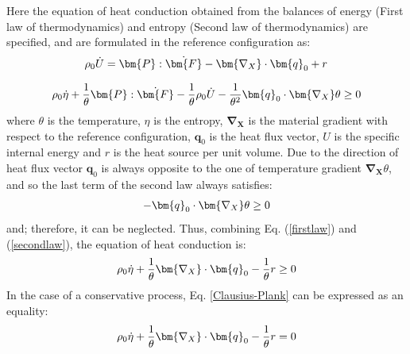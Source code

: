 \documentclass[oneside,11pt,times]{book}
\begin{document}
Here the equation of heat conduction obtained from the balances of energy (First law of thermodynamics) and entropy (Second law of thermodynamics) are specified, and are formulated in the reference configuration as:
\begin{equation}
\begin{aligned}
\centering
\rho_0 \dot{U}=\bm{P}:\dot{\bm{F}}-\bm{\nabla_{X}}\cdot\bm{q}_0+r
\end{aligned}
\label{firstlaw}
\end{equation}

\begin{equation}
\begin{aligned}
\centering
\rho_0 \dot{\eta}+\frac{1}{\theta}\bm{P}:\dot{\bm{F}}-\frac{1}{\theta}\rho_0 \dot{U}-\frac{1}{\theta^2}\bm{q}_0\cdot\bm{\nabla_{X}}\theta\geq 0
\end{aligned}
\label{secondlaw}
\end{equation}
where $\theta$ is the temperature, $\eta$ is the entropy, $\bm{\nabla_{X}}$ is the material gradient with respect to the reference configuration, $\bm{q}_0$ is the heat flux vector, $U$ is the specific internal energy and $r$ is the heat source per unit volume.
Due to the direction of heat flux vector $\bm{q}_0$ is always opposite to the one of temperature gradient $\bm{\nabla_{X}}\theta$, and so the last term of the second law always satisfies:
\begin{equation}
\begin{aligned}
\centering
-\bm{q}_0\cdot\bm{\nabla_{X}}\theta\geq 0
\end{aligned}
\label{heatconductioninequality}
\end{equation}
and; therefore, it can be neglected. Thus, combining Eq. (\ref{firstlaw}) and (\ref{secondlaw}), the equation of heat conduction is:
\begin{equation}
\begin{aligned}
\centering
\rho_0 \dot{\eta}+\frac{1}{\theta}\bm{\nabla_{X}}\cdot\bm{q}_0-\frac{1}{\theta}r\geq 0
\end{aligned}
\label{Clausius-Plank}
\end{equation}
In the case of a conservative process, Eq. \eqref{Clausius-Plank} can be expressed as an equality:
\begin{equation}
\begin{aligned}
\centering
\rho_0 \dot{\eta}+\frac{1}{\theta}\bm{\nabla_{X}}\cdot\bm{q}_0-\frac{1}{\theta}r=0
\end{aligned}
\label{Conservative}
\end{equation}
\end{document}
